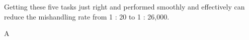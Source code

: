 Getting these five tasks just right and performed smoothly and effectively can reduce the mishandling rate from 1 : 20 to 1 : 26,000.



A %



